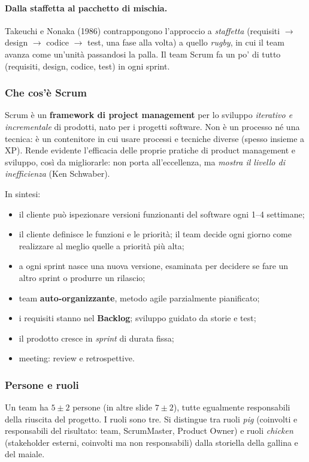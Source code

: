 \documentclass[a4paper,12pt]{article}
\begin{document}
\paragraph{Dalla staffetta al pacchetto di mischia.} Takeuchi e Nonaka (1986) contrappongono
l'approccio a \emph{staffetta} (requisiti $\to$ design $\to$ codice $\to$ test, una fase
alla volta) a quello \emph{rugby}, in cui il team avanza come un'unità passandosi la
palla. Il team Scrum fa un po' di tutto (requisiti, design, codice, test) in ogni sprint.

\subsubsection{Che cos'è Scrum}
Scrum è un \textbf{framework di project management} per lo sviluppo \emph{iterativo e
incrementale} di prodotti, nato per i progetti software. Non è un processo né una
tecnica: è un contenitore in cui usare processi e tecniche diverse (spesso insieme a XP).
Rende evidente l'efficacia delle proprie pratiche di product management e sviluppo, così
da migliorarle: non porta all'eccellenza, ma \emph{mostra il livello di inefficienza}
(Ken Schwaber).

In sintesi:
\begin{itemize}
  \item il cliente può ispezionare versioni funzionanti del software ogni 1--4 settimane;
  \item il cliente definisce le funzioni e le priorità; il team decide ogni giorno come
        realizzare al meglio quelle a priorità più alta;
  \item a ogni sprint nasce una nuova versione, esaminata per decidere se fare un altro
        sprint o produrre un rilascio;
  \item team \textbf{auto-organizzante}, metodo agile parzialmente pianificato;
  \item i requisiti stanno nel \textbf{Backlog}; sviluppo guidato da storie e test;
  \item il prodotto cresce in \emph{sprint} di durata fissa;
  \item meeting: review e retrospettive.
\end{itemize}

\subsubsection{Persone e ruoli}
Un team ha $5\pm2$ persone (in altre slide $7\pm2$), tutte egualmente responsabili della
riuscita del progetto. I ruoli sono tre. Si distingue tra ruoli \emph{pig} (coinvolti
e responsabili del risultato: team, ScrumMaster, Product Owner) e ruoli \emph{chicken}
(stakeholder esterni, coinvolti ma non responsabili) dalla storiella della gallina e del
maiale.
\end{document}
